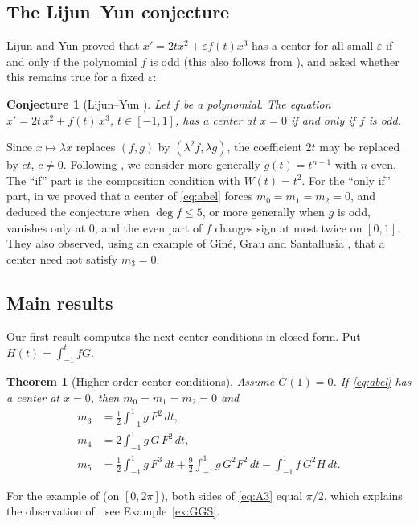 \documentclass[11pt]{amsart}
\numberwithin{equation}{section}
\theoremstyle{plain}
\newtheorem{conjecture}[theorem]{Conjecture}
\newtheorem{mainthm}{Theorem}
\theoremstyle{definition}
\theoremstyle{remark}
\begin{document}
\subsection*{The Lijun--Yun conjecture}
Lijun and Yun \cite[Thm.~5.5]{LY01} proved that $x'=2tx^2+\varepsilon f(t)x^3$
has a center for all small $\varepsilon$ if and only if the polynomial $f$ is
odd (this also follows from \cite{Pak17}), and asked whether this remains true
for a fixed $\varepsilon$:

\begin{conjecture}[{Lijun--Yun \cite[Rem.~5.6]{LY01}}]\label{conj:LY}
Let $f$ be a polynomial. The equation $x'=2t\,x^2+f(t)\,x^3$, $t\in[-1,1]$, has a
center at $x=0$ if and only if $f$ is odd.
\end{conjecture}

Since $x\mapsto\lambda x$ replaces $(f,g)$ by $(\lambda^2f,\lambda g)$, the
coefficient $2t$ may be replaced by $ct$, $c\ne0$. Following \cite{ALA20}, we
consider more generally $g(t)=t^{n-1}$ with $n$ even. The ``if'' part is the
composition condition with $W(t)=t^2$. For the ``only if'' part, in \cite{ALA20}
we proved that a center of \eqref{eq:abel} forces
$m_0=m_1=m_2=0$, and deduced the conjecture when $\deg f\le5$, or more generally
when $g$ is odd, vanishes only at $0$, and the even part of $f$ changes sign at
most twice on $[0,1]$. They also observed, using an example of Gin\'e, Grau and
Santallusia \cite{GGS14}, that a center need not satisfy $m_3=0$.

\subsection*{Main results}
Our first result computes the next center conditions in closed form. Put
$H(t)=\int_{-1}^t fG$.

\begin{mainthm}[Higher-order center conditions]\label{thm:A}
Assume $G(1)=0$. If \eqref{eq:abel} has a center at $x=0$, then
$m_0=m_1=m_2=0$ and
\begin{align}
 m_3&=\frac12\int_{-1}^1 g\,F^2\,dt, \label{eq:A3}\\
 m_4&=2\int_{-1}^1 g\,G\,F^2\,dt, \label{eq:A4}\\
 m_5&=\frac12\int_{-1}^1 g\,F^3\,dt+\frac92\int_{-1}^1 g\,G^2F^2\,dt
 -\int_{-1}^1 f\,G^2H\,dt. \label{eq:A5}
\end{align}
\end{mainthm}

For the example of \cite{GGS14} (on $[0,2\pi]$), both sides of \eqref{eq:A3} equal
$\pi/2$, which explains the observation of \cite{ALA20}; see
Example~\ref{ex:GGS}.
\end{document}
